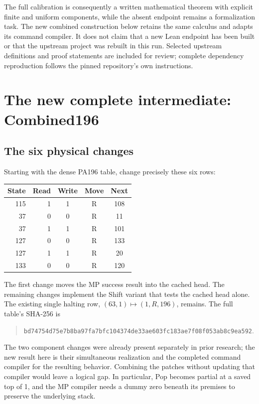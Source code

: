 \documentclass[11pt,a4paper]{article}
\begin{document}
The full calibration is consequently a written mathematical theorem with
explicit finite and uniform components, while the absent endpoint remains
a formalization task. The new combined construction below retains the same
calculus and adapts its command compiler. It does not claim that a new
Lean endpoint has been built or that the upstream project was rebuilt in
this run. Selected upstream definitions and proof statements are included
for review; complete dependency reproduction follows the pinned repository's
own instructions.

\section{The new complete intermediate: Combined196}
\subsection{The six physical changes}
Starting with the dense PA196 table, change precisely these six rows:
\begin{center}
\begin{tabular}{@{}rrccc@{}}
\toprule
State&Read&Write&Move&Next\\
\midrule
115&1&1&R&108\\
37&0&0&R&11\\
37&1&1&R&101\\
127&0&0&R&133\\
127&1&1&R&20\\
133&0&0&R&120\\
\bottomrule
\end{tabular}
\end{center}
The first change moves the MP success result into the cached head. The
remaining changes implement the Shift variant that tests the cached head
alone. The existing single halting row, $(63,1)\mapsto(1,R,196)$, remains.
The full table's SHA-256 is
\begin{quote}\small
\nolinkurl{bd74754d75e7b8ba97fa7bfc104374de33ae603fc183ae7f08f053ab8c9ea592}.
\end{quote}

The two component changes were already present separately in prior research;
the new result here is their simultaneous realization and the completed
command compiler for the resulting behavior. Combining the patches without
updating that compiler would leave a logical gap. In particular, Pop becomes
partial at a saved top of 1, and the MP compiler needs a dummy zero beneath
its premises to preserve the underlying stack.
\end{document}
